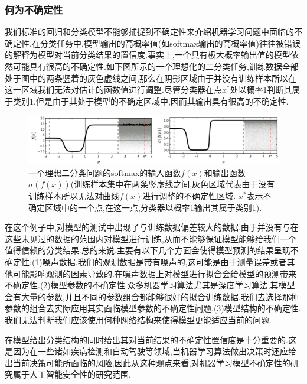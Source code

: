 \documentclass{ctexart}
\begin{document}
\subsubsection{何为不确定性}
我们标准的回归和分类模型不能够捕捉到不确定性来介绍机器学习问题中面临的不确定性.在分类任务中,模型输出的高概率值(如softmax输出的高概率值)往往被错误的解释为模型对当前分类结果的置信度.事实上,一个具有极大概率输出值的模型依然可能具有很高的不确定性.如下图所示的一个理想化的二分类任务,训练数据全部处于图中的两条竖着的灰色虚线之间,那么在阴影区域由于并没有训练样本所以在这一区域我们无法对估计的函数值进行调整.尽管分类器在点$x^*$处以概率1判断其属于类别1,但是由于其处于模型的不确定区域中,因而其输出具有很高的不确定性.\cite{gal2016dropout}
\begin{figure}[htb!]
	\centering
	\includegraphics[scale=0.5]{uncertainty.png}
	\caption{一个理想二分类问题的softmax的输入函数$f(x)$和输出函数$\sigma(f(x))$(训练样本集中在两条竖虚线之间,灰色区域代表由于没有训练样本所以无法对曲线$f(x)$进行调整的不确定性区域. $x^*$表示不确定区域中的一个点,在这一点,分类器以概率1输出其属于类别1).}
\end{figure}


在这个例子中,对模型的测试中出现了与训练数据偏差较大的数据,由于并没有与在这些未见过的数据的范围内对模型进行训练,从而不能够保证模型能够给我们一个值得信赖的分类结果.总的来说,主要有以下几个方面会使得模型预测的结果呈现不确定性:(1)噪声数据.我们的观测数据是带有噪声的,这可能是由于测量误差或者其他可能影响观测的因素导致的.在噪声数据上对模型进行拟合会给模型的预测带来不确定性.(2)模型参数的不确定性.众多机器学习算法尤其是深度学习算法,其模型会有大量的参数,并且不同的参数组合都能够很好的拟合训练数据.我们去选择那种参数的组合去实际应用其实面临模型参数的不确定性问题.(3)模型结构的不确定性.我们无法判断我们应该使用何种网络结构来使得模型更能适应当前的问题.


在模型给出分类结构的同时给出其对当前结果的不确定性置信度是十分重要的.这是因为在一些诸如疾病检测和自动驾驶等领域,当机器学习算法做出决策时还应给出当前决策可能所面临的风险,因此从这种观点来看,对机器学习模型不确定性的研究属于人工智能安全性的研究范围.
\end{document}
